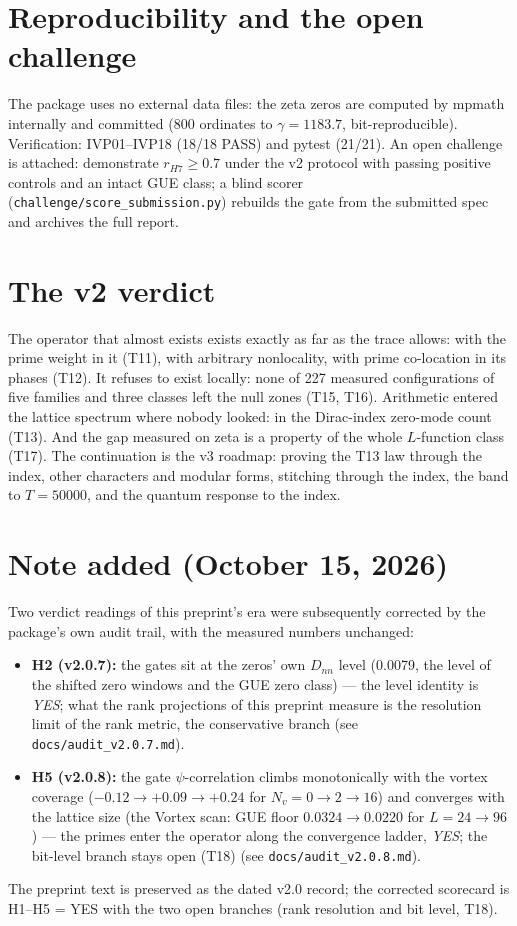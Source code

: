 \documentclass[11pt]{article}
\theoremstyle{definition}
\begin{document}
\section{Reproducibility and the open challenge}
The package uses no external data files: the zeta zeros are computed by
mpmath internally and committed (800 ordinates to $\gamma = 1183.7$,
bit-reproducible). Verification: IVP01--IVP18 (18/18 PASS) and pytest
(21/21). An open challenge is attached: demonstrate $r_{H7} \ge 0.7$
under the v2 protocol with passing positive controls and an intact GUE
class; a blind scorer (\texttt{challenge/score\_submission.py}) rebuilds
the gate from the submitted spec and archives the full report.

\section{The v2 verdict}
The operator that almost exists exists exactly as far as the trace
allows: with the prime weight in it (T11), with arbitrary nonlocality,
with prime co-location in its phases (T12). It refuses to exist locally:
none of 227 measured configurations of five families and three classes
left the null zones (T15, T16). Arithmetic entered the lattice spectrum
where nobody looked: in the Dirac-index zero-mode count (T13). And the
gap measured on zeta is a property of the whole $L$-function class
(T17). The continuation is the v3 roadmap: proving the T13 law through
the index, other characters and modular forms, stitching through the
index, the band to $T = 50000$, and the quantum response to the index.


\section*{Note added (October 15, 2026)}
Two verdict readings of this preprint's era were subsequently corrected by
the package's own audit trail, with the measured numbers unchanged:
\begin{itemize}
\item \textbf{H2 (v2.0.7):} the gates sit at the zeros' own $D_{nn}$ level
(0.0079, the level of the shifted zero windows and the GUE zero class) ---
the level identity is \emph{YES}; what the rank projections of this
preprint measure is the resolution limit of the rank metric, the
conservative branch (see \texttt{docs/audit\_v2.0.7.md}).
\item \textbf{H5 (v2.0.8):} the gate $\psi$-correlation climbs monotonically
with the vortex coverage ($-0.12 \to +0.09 \to +0.24$ for $N_v = 0 \to 2
\to 16$) and converges with the lattice size (the Vortex scan: GUE floor
$0.0324 \to 0.0220$ for $L = 24 \to 96$) --- the primes enter the operator
along the convergence ladder, \emph{YES}; the bit-level branch stays open
(T18) (see \texttt{docs/audit\_v2.0.8.md}).
\end{itemize}
The preprint text is preserved as the dated v2.0 record; the corrected
scorecard is H1--H5 = YES with the two open branches (rank resolution and
bit level, T18).
\end{document}
